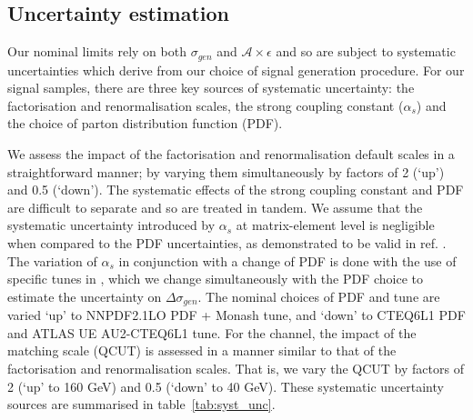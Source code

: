 
\subsection{Uncertainty estimation}
Our nominal limits rely on both $\sigma_{gen}$ and $\mathcal{A}\times\epsilon$ and so are subject to systematic uncertainties which derive from our choice of signal generation procedure. For our signal samples, there are three key sources of systematic uncertainty: the factorisation and renormalisation scales, the strong coupling constant ($\alpha_{s}$) and the choice of parton distribution function (PDF).

%
%
We assess the impact of the factorisation and renormalisation default scales in a straightforward manner; by varying them simultaneously by factors of 2 (`up') and 0.5 (`down'). The systematic effects of the strong coupling constant and PDF are difficult to separate and so are treated in tandem. We assume that the systematic uncertainty introduced by $\alpha_{s}$ at matrix-element level is negligible when compared to the PDF uncertainties, as demonstrated to be valid in ref. \cite{CERN-THESIS-2015-038}. The variation of $\alpha_{s}$ in conjunction with a change of PDF is done with the use of specific tunes in \PYTHIA, which we change simultaneously with the PDF choice to estimate the uncertainty on $\Delta \sigma_{gen}$. The nominal choices of PDF and tune are varied `up' to NNPDF2.1LO PDF + Monash tune, and `down' to CTEQ6L1 PDF and ATLAS UE AU2-CTEQ6L1 tune. For the \monojet channel, the impact of the matching scale (QCUT) is assessed in a manner similar to that of the factorisation and renormalisation scales. That is, we vary the QCUT by factors of 2 (`up' to 160 GeV) and 0.5 (`down' to 40 GeV). These systematic uncertainty sources are summarised in table~\ref{tab:syst_unc}.

